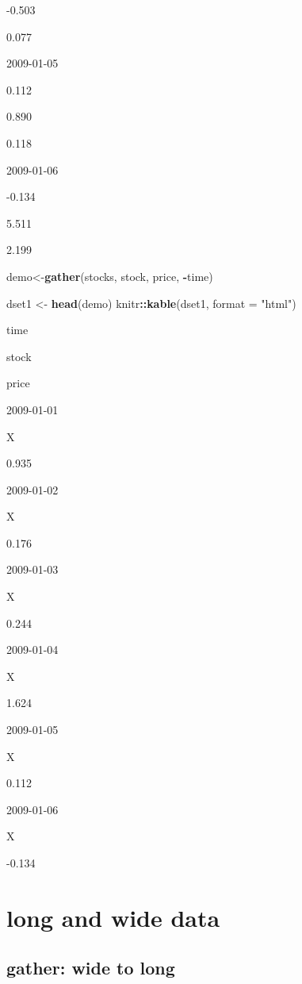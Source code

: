 \documentclass[]{book}
\newenvironment{Shaded}{\begin{snugshade}}{\end{snugshade}}
\newcommand{\KeywordTok}[1]{\textcolor[rgb]{0.13,0.29,0.53}{\textbf{#1}}}
\newcommand{\DataTypeTok}[1]{\textcolor[rgb]{0.13,0.29,0.53}{#1}}
\newcommand{\StringTok}[1]{\textcolor[rgb]{0.31,0.60,0.02}{#1}}
\newcommand{\OperatorTok}[1]{\textcolor[rgb]{0.81,0.36,0.00}{\textbf{#1}}}
\newcommand{\NormalTok}[1]{#1}
\theoremstyle{definition}
\theoremstyle{definition}
\theoremstyle{definition}
\theoremstyle{remark}
\begin{document}
-0.503

0.077

2009-01-05

0.112

0.890

0.118

2009-01-06

-0.134

5.511

2.199

\begin{Shaded}
\begin{Highlighting}[]
\NormalTok{demo<-}\KeywordTok{gather}\NormalTok{(stocks, stock, price, }\OperatorTok{-}\NormalTok{time)}

\NormalTok{dset1 <-}\StringTok{ }\KeywordTok{head}\NormalTok{(demo)}
\NormalTok{knitr}\OperatorTok{::}\KeywordTok{kable}\NormalTok{(dset1, }\DataTypeTok{format =} \StringTok{"html"}\NormalTok{)}
\end{Highlighting}
\end{Shaded}

time

stock

price

2009-01-01

X

0.935

2009-01-02

X

0.176

2009-01-03

X

0.244

2009-01-04

X

1.624

2009-01-05

X

0.112

2009-01-06

X

-0.134

\section{long and wide data}\label{long-and-wide-data}

\subsection{gather: wide to long}\label{gather-wide-to-long}
\end{document}
